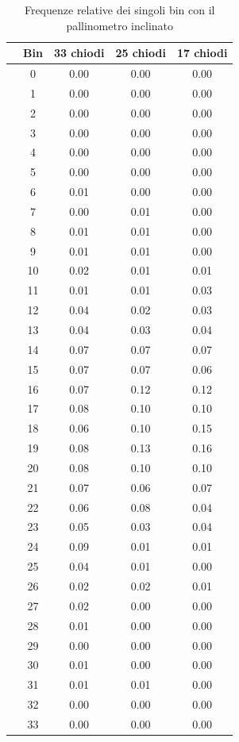 \documentclass[10pt,oneside,a4paper]{article}
\begin{document}
\begin{table}[H]
\caption{Frequenze relative dei singoli bin con il pallinometro inclinato}
\label{tab:freq_rel_inclinato}
\centering
\begin{tabular}{ccccc}
  \hline
 & Bin & 33 chiodi & 25 chiodi & 17 chiodi \\   
 \hline
&0 & 0.00 & 0.00 & 0.00 \\ 
&1 & 0.00 & 0.00 & 0.00 \\ 
  &2 & 0.00 & 0.00 & 0.00 \\ 
  &3 & 0.00 & 0.00 & 0.00 \\ 
  &4 & 0.00 & 0.00 & 0.00 \\ 
  &5 & 0.00 & 0.00 & 0.00 \\ 
  &6 & 0.01 & 0.00 & 0.00 \\ 
  &7 & 0.00 & 0.01 & 0.00 \\ 
  &8 & 0.01 & 0.01 & 0.00 \\ 
  &9 & 0.01 & 0.01 & 0.00 \\ 
  &10 & 0.02 & 0.01 & 0.01 \\ 
  &11 & 0.01 & 0.01 & 0.03 \\ 
  &12 & 0.04 & 0.02 & 0.03 \\ 
  &13 & 0.04 & 0.03 & 0.04 \\ 
  &14 & 0.07 & 0.07 & 0.07 \\ 
  &15 & 0.07 & 0.07 & 0.06 \\ 
  &16 & 0.07 & 0.12 & 0.12 \\ 
  &17 & 0.08 & 0.10 & 0.10 \\ 
  &18 & 0.06 & 0.10 & 0.15 \\ 
  &19 & 0.08 & 0.13 & 0.16 \\ 
  &20 & 0.08 & 0.10 & 0.10 \\ 
  &21 & 0.07 & 0.06 & 0.07 \\ 
  &22 & 0.06 & 0.08 & 0.04 \\ 
  &23 & 0.05 & 0.03 & 0.04 \\ 
  &24 & 0.09 & 0.01 & 0.01 \\ 
  &25 & 0.04 & 0.01 & 0.00 \\ 
  &26 & 0.02 & 0.02 & 0.01 \\ 
  &27 & 0.02 & 0.00 & 0.00 \\ 
  &28 & 0.01 & 0.00 & 0.00 \\ 
  &29 & 0.00 & 0.00 & 0.00 \\ 
  &30 & 0.01 & 0.00 & 0.00 \\ 
  &31 & 0.01 & 0.01 & 0.00 \\ 
  &32 & 0.00 & 0.00 & 0.00 \\ 
  &33 & 0.00 & 0.00 & 0.00 \\ 
   \hline
\end{tabular}
\end{table}
\end{document}
